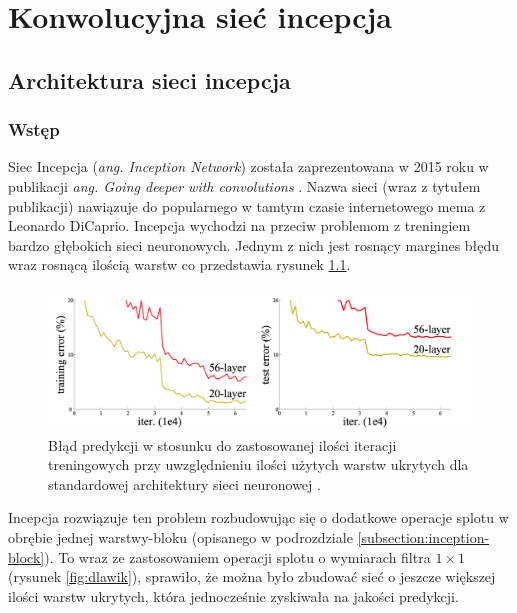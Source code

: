 \chapter{Konwolucyjna sieć incepcja}
\label{chap:inception}

\section{Architektura sieci incepcja}

\subsection{Wstęp}
Siec Incepcja (\textit{ang. Inception Network}) została zaprezentowana w 2015 roku w publikacji \textit{ang. Going deeper with convolutions} \cite{inceptionpaper}. 
Nazwa sieci (wraz z tytułem publikacji) nawiązuje do popularnego w tamtym czasie internetowego mema z Leonardo DiCaprio. 
Incepcja wychodzi na przeciw problemom z treningiem bardzo głębokich sieci neuronowych. Jednym z nich jest rosnący margines błędu wraz rosnącą ilością warstw co przedstawia rysunek \ref{fig:deep-error}.

\begin{figure}[ht]
\centerline{\includegraphics[scale=0.2]{resources/inception/deep-error.png}}
\caption{Błąd predykcji w stosunku do zastosowanej ilości iteracji treningowych przy uwzględnieniu ilości użytych warstw ukrytych dla standardowej architektury sieci neuronowej \cite{resnetpaper}.}
\label{fig:deep-error}
\end{figure}

Incepcja rozwiązuje ten problem rozbudowując się o dodatkowe operacje splotu w obrębie jednej warstwy-bloku (opisanego w podrozdziale \ref{subsection:inception-block}).
To wraz ze zastosowaniem operacji splotu o wymiarach filtra \(1 \times 1\) (rysunek \ref{fig:dlawik}), sprawiło, że można było zbudować sieć o jeszcze większej ilości warstw ukrytych, która jednocześnie zyskiwała na jakości predykcji.

